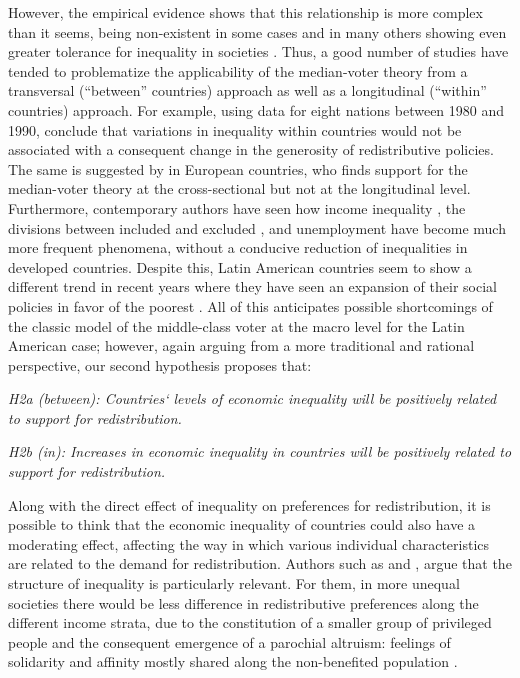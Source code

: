 \documentclass[utf8]{frontiersSCNS} %
\begin{document}
However, the empirical evidence shows that this relationship is more complex than it seems, being non-existent in some cases \parencite{lubker2007inequality} and in many others showing even greater tolerance for inequality in societies \parencite{Castillolegitimacyeconomicinequality2010, Sachwehwelfarestateequality2010,SchroderIncomeInequalityRelated2017,mijs2019paradox}. Thus, a good number of studies have tended to problematize the applicability of the median-voter theory from a transversal (“between” countries) approach \parencite{AlesinaFightingPovertyUS2004, KenworthyRisingInequalityPolitics2005} as well as a longitudinal (“within” countries) approach. For example, using data for eight nations between 1980 and 1990, \textcite{KenworthyInequalitypublicopinion2007} conclude that variations in inequality within countries would not be associated with a consequent change in the generosity of redistributive policies. The same is suggested by \textcite{Schmidt-CatranEconomicinequalitypublic2016} in European countries, who finds support for the median-voter theory at the cross-sectional but not at the longitudinal level.
Furthermore, contemporary authors have seen how income inequality \parencite{AtkinsonTopIncomesLong2011, HuberDevelopmentCrisisWelfare2001}, the divisions between included and excluded \parencite{RuedaSocialDemocracyOut2008}, and unemployment \parencite{RehmSocialPolicyPopular2011} have become much more frequent phenomena, without a conducive reduction of inequalities in developed countries. Despite this, Latin American countries seem to show a different trend in recent years where they have seen an expansion of their social policies in favor of the poorest \parencite{GarayIncludingOutsidersSocial2010, MaresSocialPolicyDeveloping2009}. All of this anticipates possible shortcomings of the classic model of the middle-class voter at the macro level for the Latin American case; however, again arguing from a more traditional and rational perspective, our second hypothesis proposes that:

\textit{H2a (between): Countries‘ levels of economic inequality will be positively related to support for redistribution.}

\textit{H2b (in): Increases in economic inequality in countries will be positively related to support for redistribution.}

Along with the direct effect of inequality on preferences for redistribution, it is possible to think that the economic inequality of countries could also have a moderating effect, affecting the way in which various individual characteristics are related to the demand for redistribution. Authors such as \textcite{LupuStructureInequalityPolitics2011} and \textcite{LuttigStructureInequalityAmericans2013}, argue that the structure of inequality is particularly relevant. For them, in more unequal societies there would be less difference in redistributive preferences along the different income strata, due to the constitution of a smaller group of privileged people and the consequent emergence of a parochial altruism: feelings of solidarity and affinity mostly shared along the non-benefited population \textcite{FowlerselfSocialidentity2007}.
\end{document}
